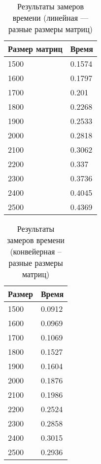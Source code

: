 \begin{table}[h]
	\begin{center}
		\begin{threeparttable}
			\captionsetup{justification=raggedright,singlelinecheck=off}
			\caption{Результаты замеров времени (линейная --- разные размеры матриц)}
			\label{tbl:time_lin_size}
			\begin{tabular}{|p{6cm}|p{6cm}|}
				\hline
				Размер матриц & Время \\
				\hline
				1500 & 0.1574 \\ \hline 
				1600 & 0.1797 \\ \hline 
				1700 & 0.201 \\ \hline 
				1800 & 0.2268 \\ \hline 
				1900 & 0.2533 \\ \hline 
				2000 & 0.2818 \\ \hline 
				2100 & 0.3062 \\ \hline 
				2200 & 0.337 \\ \hline 
				2300 & 0.3736 \\ \hline 
				2400 & 0.4045 \\ \hline 
				2500 & 0.4369 \\ \hline 
				
			\end{tabular}
		\end{threeparttable}
	\end{center}
\end{table}


\begin{table}[h]
	\begin{center}
		\begin{threeparttable}
			\captionsetup{justification=raggedright,singlelinecheck=off}
			\caption{Результаты замеров времени (конвейерная -- разные размеры матриц)}
			\label{tbl:time_conv_size}
			\begin{tabular}{|p{6cm}|p{6cm}|}
				\hline
				Размер & Время \\
				\hline 
				1500 & 0.0912 \\ \hline 
				1600 & 0.0969 \\ \hline 
				1700 & 0.1069 \\ \hline 
				1800 & 0.1527 \\ \hline 
				1900 & 0.1604 \\ \hline 
				2000 & 0.1876 \\ \hline 
				2100 & 0.1986 \\ \hline 
				2200 & 0.2524 \\ \hline 
				2300 & 0.2858 \\ \hline 
				2400 & 0.3015 \\ \hline 
				2500 & 0.2936 \\ \hline 
			\end{tabular}
		\end{threeparttable}
	\end{center}
\end{table}

